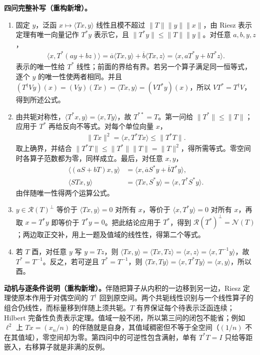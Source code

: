 \documentclass[../../main.tex]{subfiles}
\begin{document}
\begin{solution}
\textbf{四问完整补写（重构新增）。}
\begin{enumerate}
\item 固定 $y$，泛函 $x\mapsto\langle Tx,y\rangle$ 线性且模不超过 $\|T\|\|y\|\|x\|$，由 Riesz 表示定理有唯一向量记作 $T^*y$ 表示它，且 $\|T^*y\|\leqslant\|T\|\|y\|$。对任意 $a,b,y,z$，
\begin{align*}
\langle x,T^*(ay+bz)\rangle
=\overline a\langle Tx,y\rangle+\overline b\langle Tx,z\rangle
=\langle x,aT^*y+bT^*z\rangle.
\end{align*}
表示的唯一性给 $T^*$ 线性；前面的界给有界。若另一个算子满足同一恒等式，逐个 $y$ 的唯一性使两者相同。并且 $(T^\dagger Vy)(x)=(Vy)(Tx)=\langle Tx,y\rangle=(VT^*y)(x)$，所以 $VT^*=T^\dagger V$，得到所述公式。
\item 由共轭对称性，$\langle T^*x,y\rangle=\langle x,Ty\rangle$，故 $T^{**}=T$。第一问给 $\|T^*\|\leqslant\|T\|$；应用于 $T^*$ 再给反向不等式。对每个单位向量 $x$，
\begin{align*}
\|Tx\|^2=\langle x,T^*Tx\rangle\leqslant\|T^*T\|.
\end{align*}
取上确界，并结合 $\|T^*T\|\leqslant\|T^*\|\|T\|=\|T\|^2$，得所需等式。零空间时各算子范数都为零，同样成立。最后，对任意 $x,y$，
\begin{align*}
\langle(aS+bT)x,y\rangle
&=\langle x,\overline aS^*y+\overline bT^*y\rangle,\\
\langle STx,y\rangle&=\langle Tx,S^*y\rangle=\langle x,T^*S^*y\rangle.
\end{align*}
由伴随唯一性得两个运算公式。
\item $y\in\mathscr R(T)^\perp$ 等价于 $\langle Tx,y\rangle=0$ 对所有 $x$，等价于 $\langle x,T^*y\rangle=0$ 对所有 $x$，再取 $x=T^*y$ 即等价于 $T^*y=0$。把此结论应用于 $T^*$，得到 $\mathscr R(T^*)^\perp=\mathscr N(T)$；两边取正交补，用上一题及值域的线性性，得第二个等式。
\item 若 $T$ 酉，对任意 $y$ 写 $y=Tz$，则 $\langle Tx,y\rangle=\langle Tx,Tz\rangle=\langle x,z\rangle=\langle x,T^{-1}y\rangle$，故 $T^*=T^{-1}$。反之，若可逆且 $T^*=T^{-1}$，则 $\langle Tx,Ty\rangle=\langle x,T^*Ty\rangle=\langle x,y\rangle$，所以酉。
\end{enumerate}
\end{solution}
\begin{remark}
\textbf{动机与逐条件说明（重构新增）。}伴随把算子从内积的一边移到另一边，Riesz 定理使原本作用于对偶空间的 $T^\dagger$ 回到原空间。两个共轭线性识别与一个线性算子的组合仍线性，而标量移到伴随上须共轭。$T$ 有界保证每个待表示泛函连续；Hilbert 完备性负责表示定理。值域一般不闭，所以第三问的闭包不能省；例如 $\ell^2$ 上 $Tx=(x_n/n)$ 的伴随就是自身，其值域稠密但不等于全空间（$(1/n)$ 不在其值域），零空间却为零。第四问中的可逆性包含满射，单有 $T^*T=I$ 只给等距嵌入，右移算子就是非满的反例。
\end{remark}
\end{document}
